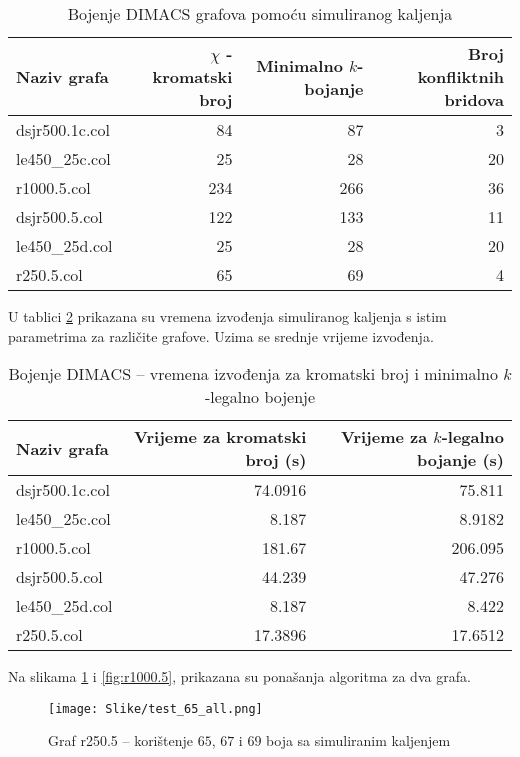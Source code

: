 \documentclass[times, utf8, diplomski, numeric]{fer}
\begin{document}
\begin{table}[htb]
	\caption{Bojenje DIMACS grafova pomoću simuliranog kaljenja}
	\label{tbl:dimacs-sa}
	\centering
	\begin{tabular}{|l||r|r|r|} \hline
	Naziv grafa & $\chi$ - kromatski broj & Minimalno $k$-bojanje & Broj konfliktnih bridova \\ \hline \hline
	dsjr500.1c.col & 84 & 87 & 3 \\ \hline 
	le450\_25c.col & 25 & 28 & 20 \\  \hline
	r1000.5.col & 234 & 266 & 36 \\ \hline
	dsjr500.5.col & 122 & 133 & 11 \\  \hline 
	le450\_25d.col & 25 & 28 & 20 \\ \hline
	r250.5.col & 65 & 69 & 4 \\ \hline
	\end{tabular}
\end{table}

U tablici \ref{tbl:dimacs-sa-time} prikazana su vremena izvođenja simuliranog kaljenja s istim parametrima za različite grafove. Uzima se srednje vrijeme izvođenja.

\begin{table}[htb]
	\caption{Bojenje DIMACS -- vremena izvođenja za kromatski broj i minimalno $k$-legalno bojenje}
	\label{tbl:dimacs-sa-time}
	\centering
	\begin{tabular}{|l||r|r|} \hline
	Naziv grafa & Vrijeme za kromatski broj (s) & Vrijeme za $k$-legalno bojanje (s) \\ \hline \hline
	dsjr500.1c.col & 74.0916 & 75.811 \\ \hline 
	le450\_25c.col & 8.187 & 8.9182 \\  \hline
	r1000.5.col & 181.67 & 206.095 \\ \hline
	dsjr500.5.col & 44.239 & 47.276  \\  \hline 
	le450\_25d.col &  8.187 & 8.422  \\ \hline
	r250.5.col & 17.3896 & 17.6512 \\ \hline
	\end{tabular}
\end{table}

Na slikama \ref{fig:r250.5} i \ref{fig:r1000.5}, prikazana su ponašanja algoritma za dva grafa.

\begin{figure}[htb]
	\texttt{[image: Slike/test\_65\_all.png]}
	\caption{Graf r250.5 -- korištenje $65$, $67$ i $69$ boja sa simuliranim kaljenjem}
	\label{fig:r250.5}
\end{figure}
\end{document}

